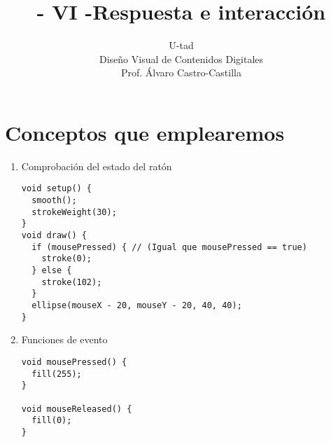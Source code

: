 \documentclass[a4paper,oneside]{article}
\title{- VI -\linebreak Respuesta e interacción}
\author{U-tad\\ Diseño Visual de Contenidos Digitales\\ Prof. Álvaro Castro-Castilla}
\date{}
\begin{document}
\maketitle


\section{Conceptos que emplearemos}
\begin{enumerate}
  \item Comprobación del estado del ratón

    \begin{verbatim}
void setup() {
  smooth();
  strokeWeight(30);
}
void draw() {
  if (mousePressed) { // (Igual que mousePressed == true)
    stroke(0);
  } else {
    stroke(102);
  }
  ellipse(mouseX - 20, mouseY - 20, 40, 40);
}
    \end{verbatim}

  \item Funciones de evento

    \begin{verbatim}
void mousePressed() {
  fill(255);
}

void mouseReleased() {
  fill(0);
}
    \end{verbatim}

\end{enumerate}

\pagebreak
\end{document}
